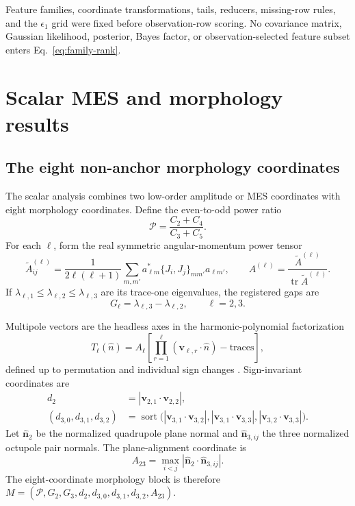\documentclass[11pt,a4paper]{article}
\newcommand{\tr}{\operatorname{tr}}
\begin{document}
Feature families, coordinate transformations, tails, reducers, missing-row
rules, and the $\epsilon_1$ grid were fixed before observation-row scoring.
No covariance matrix, Gaussian likelihood, posterior, Bayes factor, or
observation-selected feature subset enters Eq.~\eqref{eq:family-rank}.

\section{Scalar MES and morphology results}

\subsection{The eight non-anchor morphology coordinates}

The scalar analysis combines two low-order amplitude or MES coordinates with
eight morphology coordinates.  Define the even-to-odd power ratio
\begin{equation}
\mathcal P=\frac{C_2+C_4}{C_3+C_5}.
\end{equation}
For each $\ell$, form the real symmetric angular-momentum power tensor
\begin{equation}
\widetilde A^{(\ell)}_{ij}
=\frac{1}{2\ell(\ell+1)}
\sum_{m,m'}a^*_{\ell m}
\{J_i,J_j\}_{mm'}a_{\ell m'},
\qquad
A^{(\ell)}=\frac{\widetilde A^{(\ell)}}{\tr\widetilde A^{(\ell)}}.
\label{eq:power-tensor}
\end{equation}
If $\lambda_{\ell,1}\le\lambda_{\ell,2}\le\lambda_{\ell,3}$ are its
trace-one eigenvalues, the registered gaps are
\[
G_\ell=\lambda_{\ell,3}-\lambda_{\ell,2},
\qquad \ell=2,3.
\]

Multipole vectors are the headless axes in the harmonic-polynomial
factorization
\begin{equation}
T_\ell(\widehat n)=A_\ell
\left[\prod_{r=1}^{\ell}
(\boldsymbol v_{\ell,r}\!\cdot\!\widehat n)
-\text{traces}\right],
\label{eq:multipole-vector}
\end{equation}
defined up to permutation and individual sign changes
\cite{CopiHutererStarkman2004,Weeks2004}.  Sign-invariant coordinates are
\begin{align*}
d_2&=|\boldsymbol v_{2,1}\cdot\boldsymbol v_{2,2}|,\\
(d_{3,0},d_{3,1},d_{3,2})
&=\operatorname{sort}\bigl(
|\boldsymbol v_{3,1}\cdot\boldsymbol v_{3,2}|,
|\boldsymbol v_{3,1}\cdot\boldsymbol v_{3,3}|,
|\boldsymbol v_{3,2}\cdot\boldsymbol v_{3,3}|\bigr).
\end{align*}
Let $\widehat{\boldsymbol n}_2$ be the normalized quadrupole plane normal and
$\widehat{\boldsymbol n}_{3,ij}$ the three normalized octupole pair normals.
The plane-alignment coordinate is
\begin{equation}
A_{23}=\max_{i<j}
\left|\widehat{\boldsymbol n}_2\cdot
\widehat{\boldsymbol n}_{3,ij}\right|.
\end{equation}
The eight-coordinate morphology block is therefore
$M=(\mathcal P,G_2,G_3,d_2,d_{3,0},d_{3,1},d_{3,2},A_{23})$.
\end{document}
